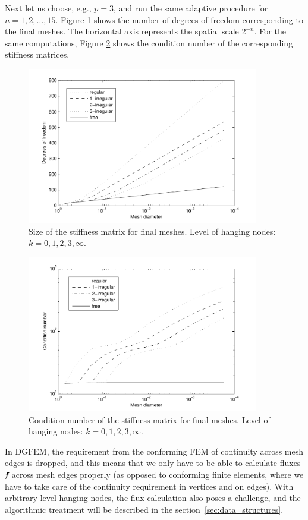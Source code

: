 Next let us choose, e.g., $p=3$, and run the same adaptive procedure for
$n = 1, 2, \ldots, 15$. Figure \ref{fig:academic3a} shows the number of degrees
of freedom corresponding to the final meshes. The horizontal axis represents
the spatial scale $2^{-n}$. 
For the same computations, Figure \ref{fig:academic3b}
shows the condition number of the corresponding stiffness matrices.

\begin{figure}[h!]
\centering
\includegraphics[width=0.9\textwidth]{img/dof-cubic}
\vspace{-4mm}
\caption{Size of the stiffness matrix for final meshes. Level of hanging
         nodes: $k = 0,1,2,3,\infty$.}
\label{fig:academic3a}
\end{figure}
\begin{figure}[h!]
\centering
\includegraphics[width=0.9\textwidth]{img/cond-cubic}
\vspace{-4mm}
\caption{Condition number of the stiffness matrix for final meshes.
         Level of hanging nodes: $k = 0,1,2,3,\infty$.}
\label{fig:academic3b}
\end{figure}

In DGFEM, the requirement from the conforming FEM of continuity across mesh edges is dropped, and this means that we only have to be able to calculate fluxes $\textit{\textbf{f}}$ across mesh edges properly (as opposed to conforming finite elements, where we have to take care of the continuity requirement in vertices and on edges). With arbitrary-level hanging nodes, the flux calculation also poses a challenge, and the algorithmic treatment will be described in the section~\ref{sec:data_structures}.
